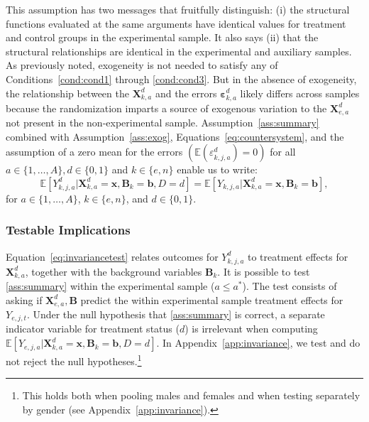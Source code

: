 This assumption has two messages that fruitfully distinguish: (i) the structural functions evaluated at the same arguments have identical values for treatment and control groups in the experimental sample. It also says (ii) that the structural relationships are identical in the experimental and auxiliary samples. As previously noted, exogeneity is not needed to satisfy any of Conditions~\ref{cond:cond1} through \ref{cond:cond3}. But in the absence of exogeneity, the relationship between the $\bm{X}^d_{k,a}$ and the errors $\bm{\varepsilon}^d_{k,a}$ likely differs across samples because the randomization imparts a source of exogenous variation to the $\bm{X}^d_{e,a}$ not present in the non-experimental sample. Assumption~\ref{ass:summary} combined with Assumption~\ref{ass:exog}, Equations~\eqref{eq:countersystem}, and the assumption of a zero mean for the errors $(\mathbb{E}(\varepsilon^d_{k,j,a})=0)$ for all $a \in \{1,\dots,A\}, d \in \{0,1\}$ and $k \in \{e,n\}$ enable us to write:
\begin{equation}\label{eq:invariancetest}
\mathbb{E} \left[ Y_{k,j,a}^d | \bm{X}_{k,a}^d  = \bm{x}, \bm{B}_k = \bm{b}, D = d \right] = \mathbb{E} \left[ Y_{k,j,a} | \bm{X}^d_{k,a}  = \bm{x}, \bm{B}_k = \bm{b} \right],
\end{equation}
for $a \in \{1,\dots,A\}$, $k \in \{e,n\}$, and $d \in \{0,1\}$.

\subsubsection{Testable Implications}

Equation~\eqref{eq:invariancetest} relates outcomes for $Y_{k,j,a}^d$ to treatment effects for $\bm{X}_{k,a}^d$, together with the background variables $\bm{B}_k$. It is possible to test \ref{ass:summary} within the experimental sample ($a \leq a^*$). The test consists of asking if $\bm{X}_{e,a}^d, \bm{B}$ predict the within experimental sample treatment effects for $Y_{e,j,t}$. Under the null hypothesis that \ref{ass:summary} is correct, a separate indicator variable for treatment status ($d$) is irrelevant when computing $\mathbb{E} \left[ Y_{e,j,a} | \bm{X}_{k,a}^d  = \bm{x}, \bm{B}_k =  \bm{b}, D = d \right]$. In Appendix~\ref{app:invariance}, we test and do not reject the null hypotheses.\footnote{This holds both when pooling males and females and when testing separately by gender (see Appendix~\ref{app:invariance}).}

